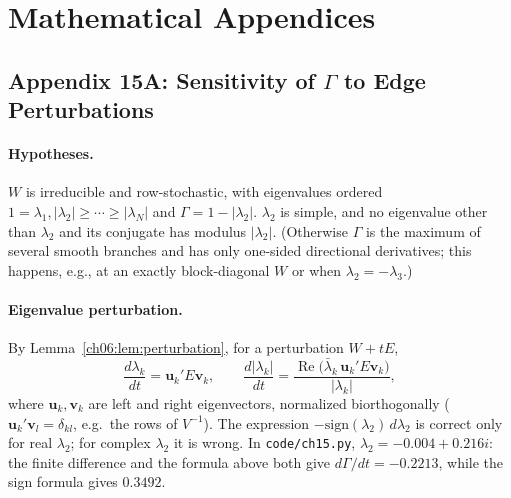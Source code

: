 \documentclass[../structural_economics_book.tex]{subfiles}
\begin{document}
\section*{Mathematical Appendices}


\subsection*{Appendix 15A: Sensitivity of $\Gamma$ to Edge Perturbations}
\label{ch15:app:sensitivity}

\paragraph{Hypotheses.} $W$ is irreducible and row-stochastic, with eigenvalues ordered $1 = \lambda_1, |\lambda_2| \geq \cdots \geq |\lambda_N|$ and $\Gamma = 1 - |\lambda_2|$. $\lambda_2$ is simple, and no eigenvalue other than $\lambda_2$ and its conjugate has modulus $|\lambda_2|$. (Otherwise $\Gamma$ is the maximum of several smooth branches and has only one-sided directional derivatives; this happens, e.g., at an exactly block-diagonal $W$ or when $\lambda_2 = -\lambda_3$.)

\paragraph{Eigenvalue perturbation.} By Lemma~\ref{ch06:lem:perturbation}, for a perturbation $W + tE$,
\begin{equation}
\frac{d\lambda_k}{dt} = \mathbf{u}_k' E \mathbf{v}_k, \qquad \frac{d|\lambda_k|}{dt} = \frac{\operatorname{Re}\big(\bar\lambda_k\,\mathbf{u}_k'E\mathbf{v}_k\big)}{|\lambda_k|},
\end{equation}
where $\mathbf{u}_k, \mathbf{v}_k$ are left and right eigenvectors, normalized biorthogonally ($\mathbf{u}_k'\mathbf{v}_l = \delta_{kl}$, e.g.\ the rows of $V^{-1}$). The expression $-\text{sign}(\lambda_2)\,d\lambda_2$ is correct only for real $\lambda_2$; for complex $\lambda_2$ it is wrong. In \texttt{code/ch15.py}, $\lambda_2 = -0.004 + 0.216i$: the finite difference and the formula above both give $d\Gamma/dt = -0.2213$, while the sign formula gives $0.3492$.
\end{document}
